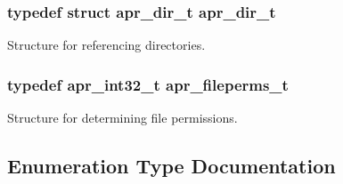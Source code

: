 \subsubsection[{\texorpdfstring{apr\+\_\+dir\+\_\+t}{apr_dir_t}}]{\setlength{\rightskip}{0pt plus 5cm}typedef struct {\bf apr\+\_\+dir\+\_\+t} {\bf apr\+\_\+dir\+\_\+t}}\hypertarget{group__apr__file__info_ga92ed8cf52cba2abb42cf74087aa74da8}{}\label{group__apr__file__info_ga92ed8cf52cba2abb42cf74087aa74da8}
Structure for referencing directories. 
\subsubsection[{\texorpdfstring{apr\+\_\+fileperms\+\_\+t}{apr_fileperms_t}}]{\setlength{\rightskip}{0pt plus 5cm}typedef apr\+\_\+int32\+\_\+t {\bf apr\+\_\+fileperms\+\_\+t}}\hypertarget{group__apr__file__info_ga3af19c4c47007169064a70f9351bc7d8}{}\label{group__apr__file__info_ga3af19c4c47007169064a70f9351bc7d8}
Structure for determining file permissions. 

\subsection{Enumeration Type Documentation}
